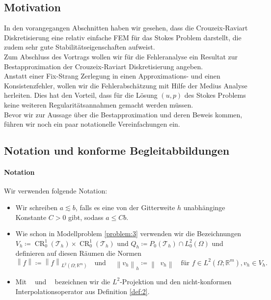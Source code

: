 \message{ !name(script.tex)}\documentclass[a4paper]{scrartcl}
\newcommand{\real}{\mathbb{R}}
\newcommand{\Ltwo}{L^2}
\newcommand{\crfem}{\operatorname{CR}_0^1}
\newcommand{\mesh}{\mathcal{T}_h}
\newcommand{\norm}[1]{\left\lVert#1\right\rVert}
\newcommand{\hnorm}[1]{\left\lVert#1\right\rVert_h}
\DeclareMathOperator{\nablah}{\nabla_{\textit{h}}}
\DeclareMathOperator{\intOp}{I_{NC}}
\DeclareMathOperator{\LtwoOp}{\Pi_0}
\theoremstyle{plain}
\theoremstyle{definition}
\theoremstyle{remark}
\begin{document}
\subsection{Motivation}
\label{sec:motivation-1}

In den vorangegangen Abschnitten haben wir gesehen, dass die
Crouzeix-Raviart Diskretisierung eine relativ einfache FEM für das
Stokes Problem darstellt, die zudem sehr gute Stabilitätseigenschaften
aufweist. \\
Zum Abschluss des Vortrags wollen wir für die Fehleranalyse ein
Resultat zur Bestapproximation der Crouzeix-Raviart Diskretisierung
angeben. \\

\noindent Anstatt einer Fix-Strang Zerlegung in einen
Approximations- und einen Konsistenzfehler, wollen wir die
Fehlerabschätzung mit Hilfe der Medius Analyse herleiten. Dies hat den
Vorteil, dass für die Lösung \((u,p)\) des Stokes Problems keine
weiteren Regularitätsannahmen gemacht werden müssen. \\

\noindent Bevor wir zur Aussage über die Bestapproximation und deren
Beweis kommen, führen wir noch ein paar notationelle Vereinfachungen
ein. 

\subsection{Notation und konforme Begleitabbildungen}
\label{sec:notat-und-konf}

\paragraph{Notation}
\label{sec:notation}

Wir verwenden folgende Notation: 
\begin{itemize}
\item Wir schreiben \(a \lesssim b\), falls es eine von der
  Gitterweite \(h\) unabhänginge Konstante \(C > 0\) gibt, sodass \(a
  \leq C b\).
\item Wie schon in Modellproblem \ref{problem:3} verwenden wir die
  Bezeichnungen \(V_h \coloneqq \crfem(\mesh)\times\crfem(\mesh)\) und \(Q_h
  \coloneqq P_0(\mesh)\cap\Ltwo_0(\Omega)\) und definieren auf diesen
  Räumen die Normen 
  \[\norm{f} \coloneqq \norm{f}_{\Ltwo(\Omega;\real^m)} \quad \text{
    und } \quad
  \hnorm{v_h} \coloneqq \norm{\nablah v_h} \quad \text{für } f\in\Ltwo(\Omega; \real^m), v_h \in V_h.\]
\item Mit \(\LtwoOp\) und \(\intOp\) bezeichnen wir die
  \(\Ltwo\)-Projektion und den nicht-konformen Interpolationsoperator
  aus Definition \ref{def:2}. 
\end{itemize}
\end{document}
